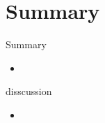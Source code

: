\section{Summary}
\begin{frame}{Summary}
  \begin{itemize}
    \item
  \end{itemize}
\end{frame}
\begin{frame}{disscussion}
  \begin{itemize}
    \item
  \end{itemize}
\end{frame}